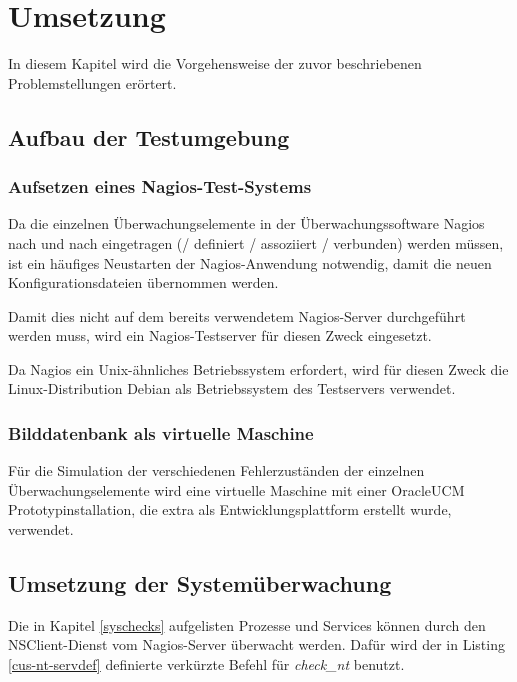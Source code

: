 \section{Umsetzung}
In diesem Kapitel wird die Vorgehensweise der zuvor beschriebenen Problemstellungen erörtert.

\subsection{Aufbau der Testumgebung}



\subsubsection{Aufsetzen eines Nagios-Test-Systems}
Da die einzelnen Überwachungselemente in der Überwachungssoftware Nagios nach und nach eingetragen (/ definiert / assoziiert / verbunden) werden müssen, ist ein häufiges Neustarten der Nagios-Anwendung notwendig, damit die neuen Konfigurationsdateien übernommen werden.

Damit dies nicht auf dem bereits verwendetem Nagios-Server durchgeführt werden muss, wird ein Nagios-Testserver für diesen Zweck eingesetzt.

Da Nagios ein Unix-ähnliches Betriebssystem erfordert, wird für diesen Zweck die Linux-Distribution Debian als Betriebssystem des Testservers verwendet.

\subsubsection{Bilddatenbank als virtuelle Maschine}
Für die Simulation der verschiedenen Fehlerzuständen der einzelnen Überwachungselemente wird eine virtuelle Maschine mit einer \gls{OracleUCM} Prototypinstallation, die extra als Entwicklungsplattform erstellt wurde, verwendet.



\subsection{Umsetzung der Systemüberwachung}

Die in Kapitel \ref{syschecks} aufgelisten Prozesse und Services können durch den NSClient-Dienst vom Nagios-Server überwacht werden.
Dafür wird der in Listing \ref{cus-nt-servdef} definierte verkürzte Befehl für \textit{check\_nt} benutzt.

